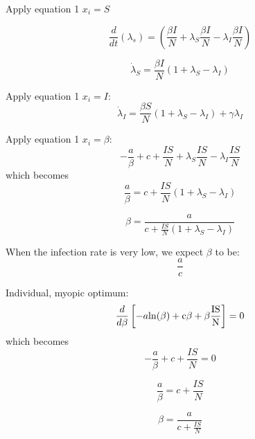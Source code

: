 \documentclass[11pt]{article} %
\begin{document}
Apply equation 1 $x_i = S$

\begin{equation}
\frac{d}{dt}\left(\lambda_s \right)=\left(\frac{\beta I}{N}+\lambda_S \frac{\beta I}{N} - \lambda_I \frac{\beta I}{N}\right)
\end{equation}

\begin{equation}
\dot{\lambda}_S = \frac{\beta I}{N}(1 + \lambda_S-\lambda_I)
\end{equation}

Apply equation 1 $x_i = I$:
\begin{equation}
\dot{\lambda}_I = \frac{\beta S}{N}(1+\lambda_S-\lambda_I)+\gamma \lambda_I
\end{equation}

Apply equation 1 $x_i = \beta$:
\begin{equation}
-\frac{a}{\beta}+c+\frac{IS}{N}+\lambda_S \frac{IS}{N}-\lambda_I \frac{IS}{N}
\end{equation}
which becomes
\begin{equation}
\frac{a}{\beta} = c + \frac{IS}{N}(1+\lambda_S-\lambda_I)
\end{equation}

\begin{equation}
\beta = \frac{a}{c+\frac{IS}{N}(1+\lambda_S-\lambda_I)}
\end{equation}


When the infection rate is very low, we expect $\beta$ to be:
\begin{equation}
\frac{a}{c}
\end{equation}



Individual, myopic optimum: 
\begin{equation}
\frac{d}{d \beta}\left[-a\rm{ln}({\beta})+c\beta+\beta\frac{ IS}{N}\right] = 0
\end{equation}
which becomes 
\begin{equation}
-\frac{a}{\beta}+c+\frac{IS}{N} = 0
\end{equation}

\begin{equation}
\frac{a}{\beta} = c+\frac{IS}{N}
\end{equation}

\begin{equation}
\beta = \frac{a}{c+\frac{IS}{N}}
\end{equation}
\end{document}
